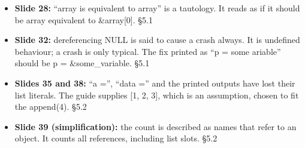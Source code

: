 \documentclass[11pt]{article}
\begin{document}
\begin{keepsection}
\begin{itemize}
\item \textbf{Slide 28:} “array is equivalent to array” is a tautology. It reads as if it should be array equivalent to \&array[0]. \hfill{\small\color{FAUblue}§5.1}
\item \textbf{Slide 32:} dereferencing NULL is said to cause a crash always. It is undefined behaviour; a crash is only typical. The fix printed as “p = some ariable” should be p = \&some\_variable. \hfill{\small\color{FAUblue}§5.1}
\item \textbf{Slides 35 and 38:} “a =”, “data =” and the printed outputs have lost their list literals. The guide supplies [1, 2, 3], which is an assumption, chosen to fit the append(4). \hfill{\small\color{FAUblue}§5.2}
\item \textbf{Slide 39 (simplification):} the count is described as names that refer to an object. It counts all references, including list slots. \hfill{\small\color{FAUblue}§5.2}
\end{itemize}
\end{keepsection}
\end{document}

